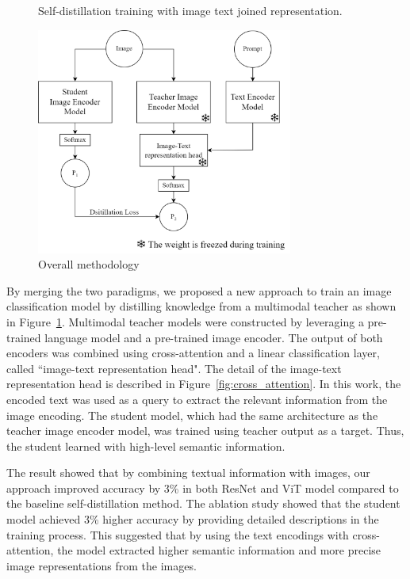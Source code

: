 \begin{figure}[h]
    \caption{Overall methodology}
    \label{fig:overall_method}
    Self-distillation training with image text joined representation.
    \begin{center}
        \includegraphics[width=0.75\textwidth]{Images/OverviewMethod.png}
    \end{center}
    \small
\end{figure}

By merging the two paradigms, we proposed a new approach to train an image classification model by distilling knowledge from a multimodal teacher as shown in Figure~\ref{fig:overall_method}.
Multimodal teacher models were constructed by leveraging a pre-trained language model and a pre-trained image encoder.
The output of both encoders was combined using cross-attention and a linear classification layer, called ``image-text representation head".
The detail of the image-text representation head is described in Figure~\ref{fig:cross_attention}.
In this work, the encoded text was used as a query to extract the relevant information from the image encoding.
The student model, which had the same architecture as the teacher image encoder model, was trained using teacher output as a target.
Thus, the student learned with high-level semantic information.

The result showed that by combining textual information with images, our approach improved accuracy by 3\% in both ResNet  and ViT  model compared to the baseline self-distillation method.
The ablation study showed that the student model achieved 3\% higher accuracy by providing detailed descriptions in the training process.
This suggested that by using the text encodings with cross-attention, the model extracted higher semantic information and more precise image representations from the images.

